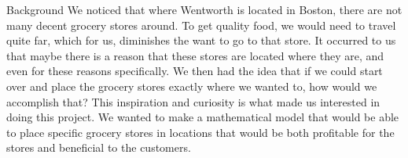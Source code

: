\documentclass[final]{beamer}
\newlength{\onecolwid}
\newlength{\twocolwid}
\begin{document}
\begin{frame}[t]
\begin{columns}[t]
\begin{column}{\twocolwid}
\begin{columns}[t,totalwidth=\twocolwid]
\begin{column}{\onecolwid}





\end{column} %

\end{columns} %

\begin{columns}[t,totalwidth=\twocolwid] %

\begin{column}{\onecolwid} %


\begin{block}{Background}
{\small
We noticed that where Wentworth is located in Boston, there are not many decent grocery stores around.  To get quality food, we would need to travel quite far, which for us, diminishes the want to go to that store.  It occurred to us that maybe there is a reason that these stores are located where they are, and even for these reasons specifically.  We then had the idea that if we could start over and place the grocery stores exactly where we wanted to, how would we accomplish that? This inspiration and curiosity is what made us interested in doing this project.  We wanted to make a mathematical model that would be able to place specific grocery stores in locations that would be both profitable for the stores and beneficial to the customers.  
}
\end{block}



\end{column}
\end{columns}
\end{column}
\end{columns}
\end{frame}
\end{document}
